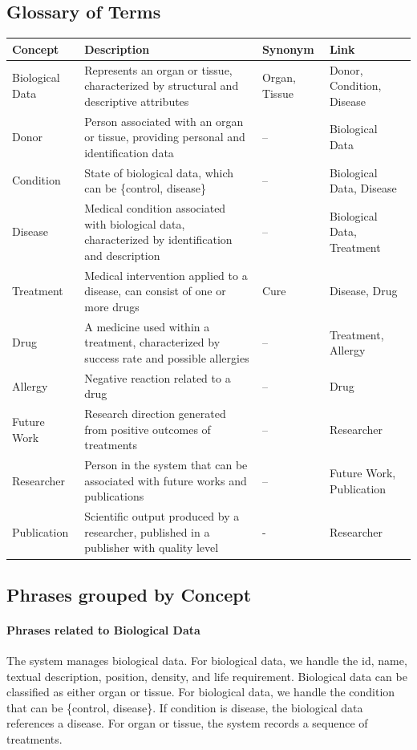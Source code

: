 \documentclass[11pt,a4paper]{article}
\begin{document}
\subsection{Glossary of Terms}

\begin{tabular}{|p{3cm}|p{7cm}|p{3cm}|p{3cm}|}
\hline
\textbf{Concept} & \textbf{Description} & \textbf{Synonym} & \textbf{Link} \\
\hline
Biological Data & Represents an organ or tissue, characterized by structural and descriptive attributes & Organ, Tissue & Donor, Condition, Disease \\
\hline
Donor & Person associated with an organ or tissue, providing personal and identification data & -- & Biological Data \\
\hline
Condition & State of biological data, which can be \{control, disease\} & -- & Biological Data, Disease \\
\hline
Disease & Medical condition associated with biological data, characterized by identification and description & -- & Biological Data, Treatment \\
\hline
Treatment & Medical intervention applied to a disease, can consist of one or more drugs & Cure & Disease, Drug \\
\hline
Drug & A medicine used within a treatment, characterized by success rate and possible allergies & -- & Treatment, Allergy \\
\hline
Allergy & Negative reaction related to a drug & -- & Drug \\
\hline
Future Work & Research direction generated from positive outcomes of treatments & -- & Researcher \\
\hline
Researcher & Person in the system that can be associated with future works and publications & -- & Future Work, Publication \\
\hline
Publication & Scientific output produced by a researcher, published in a publisher with quality level & - & Researcher \\
\hline
\end{tabular}

\subsection{Phrases grouped by Concept}

\paragraph{Phrases related to Biological Data} 
The system manages biological data. For biological data, we handle the id, name, textual description, position, density, and life requirement. Biological data can be classified as either organ or tissue. For biological data, we handle the condition that can be \{control, disease\}. If condition is disease, the biological data references a disease. For organ or tissue, the system records a sequence of treatments.
\end{document}

